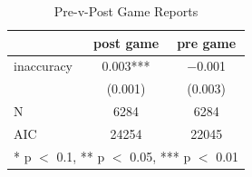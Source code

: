 \begin{table}
\centering
\caption{Pre-v-Post Game Reports}
\centering
\begin{tabular}[t]{lcc}
\toprule
  & post game & pre game\\
\midrule
inaccuracy & \num{0.003}*** & \num{-0.001}\\
 & (\num{0.001}) & (\num{0.003})\\
\midrule
N & \num{6284} & \num{6284}\\
AIC & \num{24254} & \num{22045}\\
\bottomrule
\multicolumn{3}{l}{\rule{0pt}{1em}* p $<$ 0.1, ** p $<$ 0.05, *** p $<$ 0.01}\\
\end{tabular}
\end{table}

